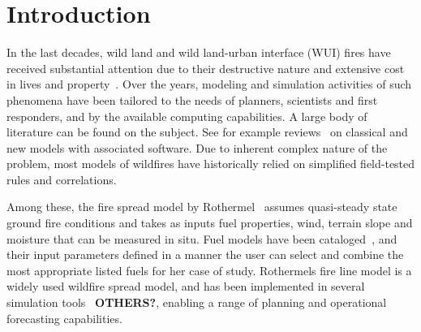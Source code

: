 \documentclass[journal,article,atmosphere,submit,moreauthors,pdftex]{Definitions/mdpi}
\begin{document}
\section{Introduction}

In the last decades, wild land and wild land-urban interface (WUI) fires have received substantial attention due to their destructive nature and extensive cost in lives and property~\cite{thomas_2017,mcdermott_2019,boghani_2019,richards_2020}. Over the years, modeling and simulation activities of such phenomena have been tailored to the needs of planners, scientists and first responders, and by the available computing capabilities.
A large body of literature can be found on the subject. See for example reviews~\cite{Papadopoulos_2011,Bakhshaii_2019,mcdermott_2019} on classical and new models with associated software. Due to inherent complex nature of the problem, most models of wildfires have historically relied on simplified field-tested rules and correlations. 

Among these, the fire spread model by Rothermel~\cite{Rothermel:1972} assumes quasi-steady state ground fire conditions and takes as inputs fuel properties, wind, terrain slope and moisture that can be measured in situ. 
Fuel models have been cataloged~\cite{Anderson:1982}, and their input parameters defined in a manner the user can select and combine the most appropriate listed fuels for her case of study. Rothermels fire line model is a widely used wildfire spread model, and has been implemented in several simulation tools~\cite{Finney:FARSITE,Bova:IJWF2015,mcgratta_2013} \textbf{OTHERS?}, enabling a range of planning and operational forecasting capabilities. 
\end{document}
